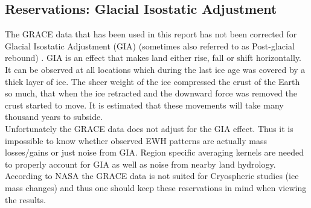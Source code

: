 \subsection{Reservations: Glacial Isostatic Adjustment}

The GRACE data that has been used in this report has not been corrected for Glacial Isostatic Adjustment (GIA) (sometimes also referred to as Post-glacial rebound) . 
GIA is an effect that makes land either rise, fall or shift horizontally. 
It can be observed at all locations which during the last ice age was covered by a thick layer of ice. 
The sheer weight of the ice compressed the crust of the Earth so much, that when the ice retracted and the downward force was removed the crust started to move.
 It is estimated that these movements will take many thousand years to subside. \\
Unfortunately the GRACE data does not adjust for the GIA effect.
 Thus it is impossible to know whether observed EWH patterns are actually mass losses/gains or just noise from GIA.
 Region specific averaging kernels are needed to properly account for GIA as well as noise from nearby land hydrology.
According to NASA  the GRACE data is not suited for Cryospheric studies (ice mass changes) and thus one should keep these reservations in mind when viewing the results.
